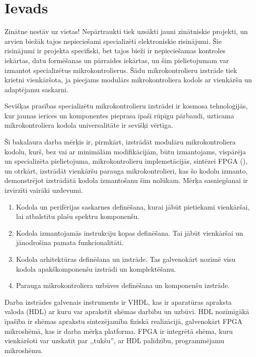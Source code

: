 \section*{Ievads} 
Zinātne nestāv uz vietas! Nepārtraukti tiek uzsākti jauni zinātniskie projekti,
un arvien biežāk tajos nepieciešami specializēti elektroniskie risinājumi.
Šie risinājumi ir projekta specifiski, bet tajos bieži ir nepieciešamas
kontroles iekārtas, datu formēšanas un pārraides iekārtas, un
šim pielietojumam var izmantot specializētus mikrokontrolierus.
Šādu mikrokontrolieru izstrāde tiek krietni vienkāršota, ja pieejams
modulārs mikrokontroliera kodols ar vienkāršu un adaptējamu saskarni.

Sevišķas prasības specializētu mikrokontrolieru izstrādei ir kosmosa
tehnoloģijās, kur jaunas ierīces un komponentes pieprasa īpaši rūpīgu
pārbaudi, uzticama mikrokontroliera kodola universalitāte ir sevišķi
vērtīga.

Šī bakalaura darba mērķis ir, pirmkārt, izstrādāt modulāru mikrokontroliera kodolu,
kurš, bez vai ar minimālām modifikācijām, būtu izmantojams,
vispārēja un specializēta pielietojuma, mikrokontrolieru implemetācijās,
sintēzei FPGA (), un otrkārt,
izstrādāt vienkāršu parauga mikrokontrolieri, kas šo kodolu izmanto,
demonstrējot izstrādātā kodola izmantošanu šim nolūkam.
Mērķa sasniegšanai ir izvirzīti vairāki uzdevumi.
\begin{enumerate}
	\item Kodola un perifērijas saskarnes definēšana,
		kurai jābūt pietiekami vienkāršai, lai atbalstītu plašu spektru
		komponenšu.
	\item Kodola izmantojamās instrukciju kopas definēšana. Tai jābūt
		vienkāršai un jānodrošina pamata funkcionalitāti.
	\item Kodola arhitektūras definēšana un izstrāde. Tas galvenokārt nozīmē
		visu kodola apakškomponenšu izstrādi un komplektēšanu.
	\item Parauga mikrokontroliera uzbūves definēšana un komponenšu izstrāde.
\end{enumerate}

Darba izstrādes galvenais instruments ir VHDL, kas ir
aparatūras apraksta valoda (HDL) ar kuru var aprakstīt shēmas darbību un uzbūvi.
HDL nozīmīgākā īpašība ir shēmas aprakstu sintezējamība fiziskā realizācijā,
galvenokārt FPGA mikroshēmā, kas ir darba mērķa platforma.
FPGA ir integrētā shēma, kuru vienkāršoti var 
uzskatīt par ,,tukšu'', ar HDL palīdzību, programmējamu mikroshēmu.

\todo

